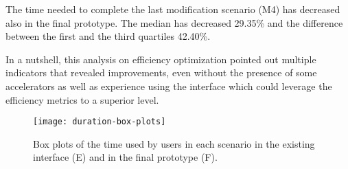 The time needed to complete the last modification scenario (M4) has decreased also in the final prototype. The median has decreased 29.35\% and the difference between the first and the third quartiles 42.40\%.

In a nutshell, this analysis on efficiency optimization pointed out multiple indicators that revealed improvements, even without the presence of some accelerators as well as experience using the interface which could leverage the efficiency metrics to a superior level.


  \begin{figure}[h]
    \centering
    \texttt{[image: duration-box-plots]}
    \caption{Box plots of the time used by users in each scenario in the existing interface (E) and in the final prototype (F).}
    \label{fig:box-plots-duration}
  \end{figure}

